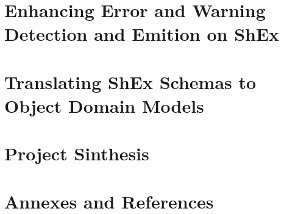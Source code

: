 \documentclass[open=any]{SPhdThesis}
\begin{document}
	\begin{frontmatter}
		\SgAddTitle%
		\SgAddToc%
		\SgAddLof%
		\SgAddLot%
	\end{frontmatter}
   
	
	
	

	\part{Enhancing Error and Warning Detection and Emition on ShEx}
	
	
	

	\part{Translating ShEx Schemas to Object Domain Models}
	
	
	

	\part{Project Sinthesis}
	
	
	

	\part{Annexes and References}
	\begin{appendices}
		
		
		
	\end{appendices}

\end{document}
